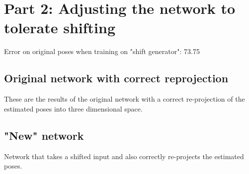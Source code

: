 \section{Part 2: Adjusting the network to tolerate shifting}
\label{sec:network-adjusting}

Error on original poses when training on "shift generator": 73.75
\subsection{Original network with correct reprojection}
These are the results of the original network with a correct re-projection of the estimated poses into three dimensional space.


\subsection{"New" network}
Network that takes a shifted input and also correctly re-projects the estimated poses.